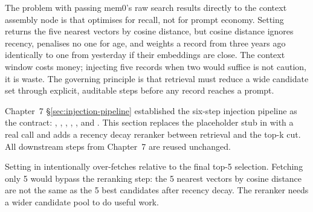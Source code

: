 The problem with passing mem0's raw search results directly to the context
assembly node is that  optimises for recall, not for prompt
economy. Setting  returns the five nearest vectors by cosine
distance, but cosine distance ignores recency, penalises no one for age,
and weights a record from three years ago identically to one from yesterday
if their embeddings are close. The context window costs money; injecting
five records when two would suffice is not caution, it is waste. The
governing principle is that retrieval must reduce a wide candidate set through
explicit, auditable steps before any record reaches a prompt.

Chapter~7 \S\ref{sec:injection-pipeline} established the six-step injection
pipeline as the contract: , ,
, , ,
and . This section replaces the placeholder stub in
 with a real  call and adds a
recency decay reranker between retrieval and the top-k cut. All downstream
steps from Chapter~7 are reused unchanged.

\begin{notebox}
Setting  in  intentionally over-fetches
relative to the final top-5 selection. Fetching only 5 would bypass the
reranking step: the 5 nearest vectors by cosine distance are not the same
as the 5 best candidates after recency decay. The reranker needs a wider
candidate pool to do useful work.
\end{notebox}


